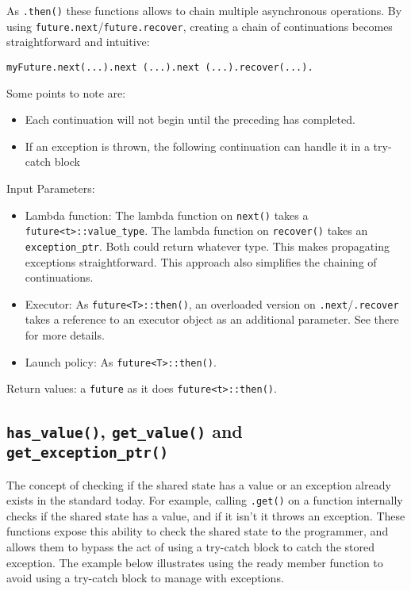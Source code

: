 \documentclass[a4paper,10pt]{article}
\newcommand{\cpp}[1]{\lstinline{#1}}
\newcommand{\suppress}[1]{\colorbox{suppress_color}{#1}}
\begin{document}
 
As \cpp{.then()} these functions allows to chain multiple asynchronous operations. By using \cpp{future.next}/\cpp{future.recover}, creating a chain of continuations becomes straightforward and intuitive:
 
\begin{lstlisting}[xleftmargin=0pt]
myFuture.next(...).next (...).next (...).recover(...). 
\end{lstlisting}

Some points to note are: 

\begin{itemize}
\item Each continuation will not begin until the preceding has completed.
\item If an exception is thrown, the following continuation can handle it in a try-catch block 
\end{itemize}

Input Parameters: 

\begin{itemize}
\item Lambda function: The lambda function on \cpp{next()} takes a 
\cpp{future<t>::value_type}. The lambda function on \cpp{recover()} takes an \cpp{exception_ptr}. Both could return whatever type. This makes propagating exceptions straightforward. This approach also simplifies the chaining of continuations.
 
\item Executor: As \cpp{future<T>::then()}, an overloaded version on \cpp{.next}/\cpp{.recover} takes a reference to an executor object as an additional parameter. See there for more details.

\item Launch policy: As \cpp{future<T>::then()}. 
\end{itemize}

Return values: a \cpp{future} as it does \cpp{future<t>::then()}.

\subsection{\cpp{has_value()}\suppress{,  \cpp{get_value()}} and \cpp{get_exception_ptr()}}

The concept of checking if the shared state has a value or an exception already exists in the standard today. For example, calling 
\cpp{.get()} on a function internally checks if the shared state has a value, and if it isn't it throws an exception. These functions expose this ability to check the shared state to the programmer, and allows them to bypass the act of using a try-catch block to catch the stored exception. The example below illustrates using the ready member function to avoid using a try-catch block to manage with exceptions.
\end{document}

